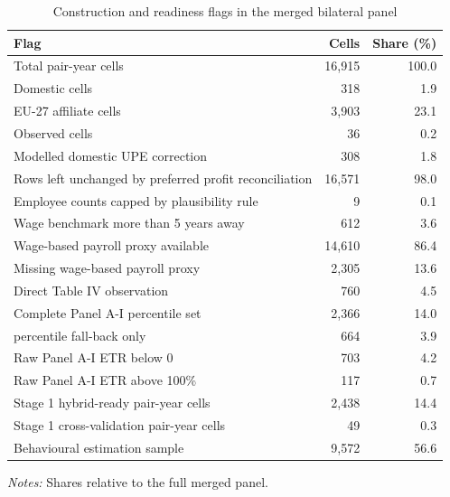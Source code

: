 \begin{table}[H]
\centering
\footnotesize
\setlength{\tabcolsep}{3pt}
\caption{Construction and readiness flags in the merged bilateral panel}
\label{tab:base_panel_flags_working}
\begin{tabular}{@{}L{5.5cm}rr@{}}
\toprule
Flag & Cells & Share (\%) \\
\midrule
Total pair-year cells & 16,915 & 100.0 \\
Domestic cells & 318 & 1.9 \\
EU-27 affiliate cells & 3,903 & 23.1 \\
Observed  cells & 36 & 0.2 \\
Modelled domestic UPE correction & 308 & 1.8 \\
Rows left unchanged by preferred profit reconciliation & 16,571 & 98.0 \\
Employee counts capped by plausibility rule & 9 & 0.1 \\
Wage benchmark more than 5 years away & 612 & 3.6 \\
Wage-based payroll proxy available & 14,610 & 86.4 \\
Missing wage-based payroll proxy & 2,305 & 13.6 \\
Direct Table IV  observation & 760 & 4.5 \\
Complete Panel A-I percentile set & 2,366 & 14.0 \\
 percentile fall-back only & 664 & 3.9 \\
Raw Panel A-I ETR below 0 & 703 & 4.2 \\
Raw Panel A-I ETR above 100\% & 117 & 0.7 \\
Stage 1 hybrid-ready pair-year cells & 2,438 & 14.4 \\
Stage 1 cross-validation pair-year cells & 49 & 0.3 \\
Behavioural estimation sample & 9,572 & 56.6 \\
\bottomrule
\end{tabular}
\vspace{0.35em}
\noindent\begin{minipage}{\textwidth}
\footnotesize\raggedright\textit{Notes:} Shares relative to the full merged panel.
\end{minipage}
\end{table}
